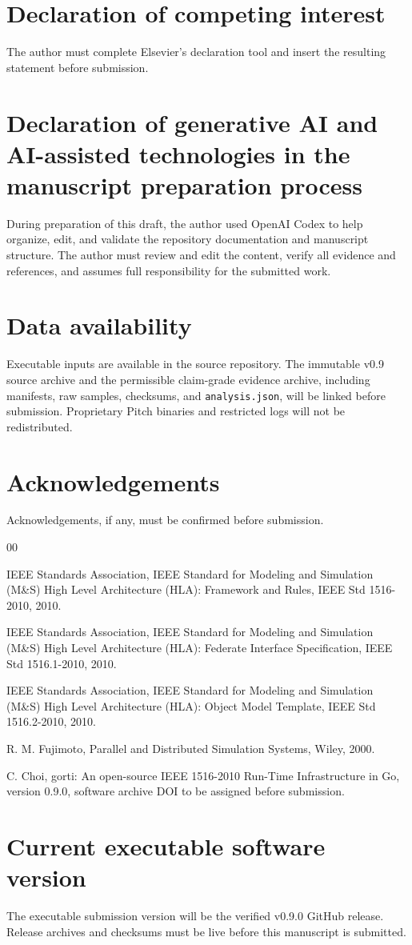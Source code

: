 \documentclass[preprint,12pt,a4paper]{elsarticle}
\begin{document}
\section*{Declaration of competing interest}

The author must complete Elsevier's declaration tool and insert the resulting
statement before submission.

\section*{Declaration of generative AI and AI-assisted technologies in the
manuscript preparation process}

During preparation of this draft, the author used OpenAI Codex to help
organize, edit, and validate the repository documentation and manuscript
structure. The author must review and edit the content, verify all evidence and
references, and assumes full responsibility for the submitted work.

\section*{Data availability}

Executable inputs are available in the source repository. The immutable v0.9
source archive and the permissible claim-grade evidence archive, including
manifests, raw samples, checksums, and \texttt{analysis.json}, will be linked
before submission. Proprietary Pitch binaries and restricted logs will not be
redistributed.

\section*{Acknowledgements}

Acknowledgements, if any, must be confirmed before submission.

\begin{thebibliography}{00}

IEEE Standards Association, IEEE Standard for Modeling and Simulation (M\&S)
High Level Architecture (HLA): Framework and Rules, IEEE Std 1516-2010, 2010.

IEEE Standards Association, IEEE Standard for Modeling and Simulation (M\&S)
High Level Architecture (HLA): Federate Interface Specification, IEEE Std
1516.1-2010, 2010.

IEEE Standards Association, IEEE Standard for Modeling and Simulation (M\&S)
High Level Architecture (HLA): Object Model Template, IEEE Std 1516.2-2010,
2010.

R. M. Fujimoto, Parallel and Distributed Simulation Systems, Wiley, 2000.

C. Choi, gorti: An open-source IEEE 1516-2010 Run-Time Infrastructure in Go,
version 0.9.0, software archive DOI to be assigned before submission.

\end{thebibliography}

\section*{Current executable software version}

The executable submission version will be the verified v0.9.0 GitHub release.
Release archives and checksums must be live before this manuscript is
submitted.
\end{document}
